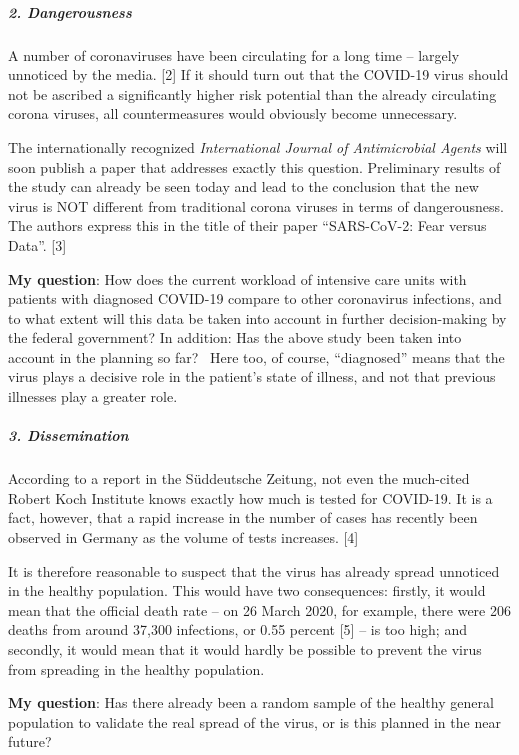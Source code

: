 \hypertarget{2-dangerousness}{%
\subparagraph{\texorpdfstring{\textbf{2.
Dangerousness}}{2. Dangerousness}}\label{2-dangerousness}}

A number of coronaviruses have been circulating for a long time --
largely unnoticed by the media. {[}2{]} If it should turn out that the
COVID-19 virus should not be ascribed a significantly higher risk
potential than the already circulating corona viruses, all
countermeasures would obviously become unnecessary.

The internationally recognized \emph{International Journal of
Antimicrobial Agents} will soon publish a paper that addresses exactly
this question. Preliminary results of the study can already be seen
today and lead to the conclusion that the new virus is NOT different
from traditional corona viruses in terms of dangerousness. The authors
express this in the title of their paper ``SARS-CoV-2: Fear versus
Data''. {[}3{]}

\textbf{My question}: How does the current workload of intensive care
units with patients with diagnosed COVID-19 compare to other coronavirus
infections, and to what extent will this data be taken into account in
further decision-making by the federal government? In addition: Has the
above study been taken into account in the planning so far?~ Here too,
of course, ``diagnosed'' means that the virus plays a decisive role in
the patient's state of illness, and not that previous illnesses play a
greater role.

\hypertarget{3-dissemination}{%
\subparagraph{\texorpdfstring{\textbf{3.
Dissemination}}{3. Dissemination}}\label{3-dissemination}}

According to a report in the Süddeutsche Zeitung, not even the
much-cited Robert Koch Institute knows exactly how much is tested for
COVID-19. It is a fact, however, that a rapid increase in the number of
cases has recently been observed in Germany as the volume of tests
increases. {[}4{]}

It is therefore reasonable to suspect that the virus has already spread
unnoticed in the healthy population. This would have two consequences:
firstly, it would mean that the official death rate -- on 26 March 2020,
for example, there were 206 deaths from around 37,300 infections, or
0.55 percent {[}5{]} -- is too high; and secondly, it would mean that it
would hardly be possible to prevent the virus from spreading in the
healthy population.

\textbf{My question}: Has there already been a random sample of the
healthy general population to validate the real spread of the virus, or
is this planned in the near future?

